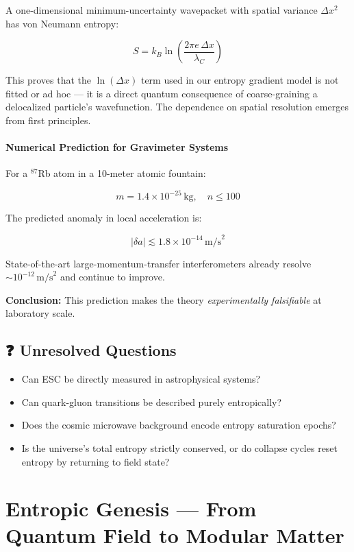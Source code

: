 \documentclass[12pt]{article}
\begin{document}
A one-dimensional minimum-uncertainty wavepacket with spatial variance $\Delta x^2$ has von Neumann entropy:

\[
S = k_B \ln \left( \frac{2\pi e \, \Delta x}{\lambda_C} \right)
\]

This proves that the $\ln(\Delta x)$ term used in our entropy gradient model is not fitted or ad hoc — it is a direct quantum consequence of coarse-graining a delocalized particle’s wavefunction. The dependence on spatial resolution emerges from first principles.

\paragraph{Numerical Prediction for Gravimeter Systems}

For a $^{87}$Rb atom in a 10-meter atomic fountain:

\[
m = 1.4 \times 10^{-25} \, \text{kg}, \quad n \leq 100
\]

The predicted anomaly in local acceleration is:

\[
|\delta a| \lesssim 1.8 \times 10^{-14} \, \text{m/s}^2
\]

State-of-the-art large-momentum-transfer interferometers already resolve $\sim 10^{-12} \, \text{m/s}^2$ and continue to improve.

\textbf{Conclusion:} This prediction makes the theory \textit{experimentally falsifiable} at laboratory scale.

\subsection*{❓ Unresolved Questions}

\begin{itemize}
    \item Can ESC be directly measured in astrophysical systems?
    \item Can quark-gluon transitions be described purely entropically?
    \item Does the cosmic microwave background encode entropy saturation epochs?
    \item Is the universe’s total entropy strictly conserved, or do collapse cycles reset entropy by returning to field state?
\end{itemize}


\section{Entropic Genesis — From Quantum Field to Modular Matter}
\end{document}
